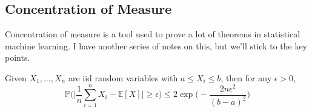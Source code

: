 \documentclass{article}
\begin{document}
  \subsection{Concentration of Measure}

    Concentration of measure is a tool used to prove a lot of theorems in statistical machine learning. I have another series of notes on this, but we'll stick to the key points. 

    \begin{definition}
      Given $X_1, \ldots, X_n$ are iid random variables with $a \leq X_i \leq b$, then for any $\epsilon > 0$, 
      \begin{equation}
        \mathbb{P} \bigg( \bigg| \frac{1}{n} \sum_{i=1}^n X_i - \mathbb{E}[X] \bigg| \geq \epsilon \bigg) \leq 2 \exp \bigg( - \frac{2 n \epsilon^2}{(b - a)^2} \bigg)
      \end{equation}
    \end{definition}
\end{document}
